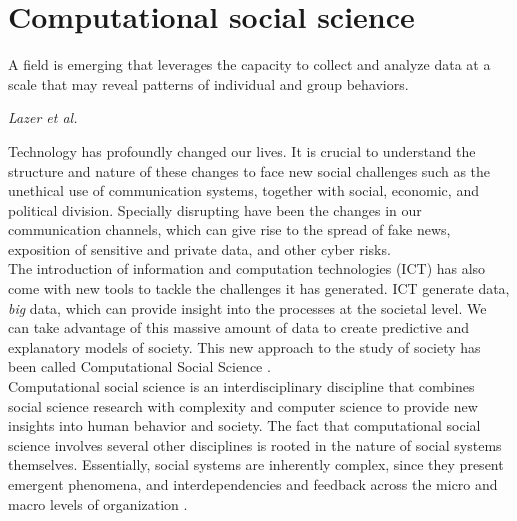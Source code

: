 \section{Computational social science}\label{chp:methods:CSS}

\epigraph{A field is emerging that leverages the capacity to collect and analyze data at a scale that may reveal patterns of individual and group behaviors.}{\textit{Lazer et al.} \cite{lazer2009computational}}
Technology has profoundly changed our lives. It is crucial to understand the structure and nature of these changes to face new social challenges such as the  unethical use of communication systems, together with social, economic, and political division. Specially disrupting have been the changes in our communication channels, which can give rise to the spread of fake news, exposition of sensitive and private data, and other cyber risks.\\

The introduction of information and computation technologies (ICT) has also come with new tools to tackle the challenges it has generated.  ICT generate data, \textit{big} data, which can provide insight into the processes at the societal level. We can take advantage of this massive amount of data to create predictive and explanatory models of society. This new approach to the study of society has been called Computational Social Science \cite{lazer2009computational,lazer2020computational}. \\

Computational social science is an interdisciplinary discipline that combines social science research with complexity  and computer science to provide new insights into human behavior and society. The fact that computational social science involves several other disciplines is rooted in the nature of social systems themselves. Essentially, social systems are inherently complex, since they present emergent phenomena, and interdependencies
and feedback across the micro and macro levels of organization \cite{conte2012manifesto}.\\

